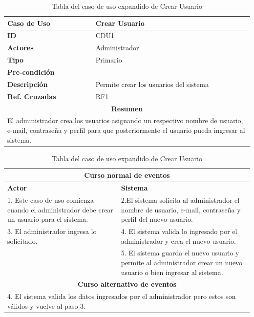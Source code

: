 \begin{table}
\centering
\begin{tabular}{|p{6cm} |p{6cm}|}
	\hline \textbf{Caso de Uso} & Crear Usuario  \\ 
	\hline \textbf{ID} & CDU1 \\ 
	\hline \textbf{Actores} & Administrador \\ 
	\hline \textbf{Tipo} & Primario \\ 
	\hline \textbf{Pre-condición} & - \\ 
	\hline \textbf{Descripción} & Permite crear los usuarios del sistema \\
	\hline \textbf{Ref. Cruzadas} & RF1 \\ 
	\hline
	\multicolumn{2}{|c|}{\textbf{Resumen}} \\
	\hline
	\multicolumn{2}{|p{12cm}|}{El administrador crea los usuarios asignando un respectivo nombre de usuario, e-mail, contraseña y perfil para que posteriormente el usuario pueda ingresar al sistema.} \\
	\hline 
\end{tabular}  

\begin{tabular}{|p{6cm}|p{6cm}|}
	
	\multicolumn{2}{|c|}{\textbf{Curso normal de eventos}} \\
	\hline \textbf{Actor} & \textbf{Sistema} \\ 
	\hline 1. Este caso de uso comienza cuando el administrador debe crear un usuario para el sistema. & 2.El sistema solicita al administrador el nombre de usuario, e-mail, contraseña y perfil del nuevo usuario.  \\ 
	3. El administrador ingresa lo solicitado. & 4. El sistema valida lo ingresado por el administrador y crea el nuevo usuario. \\
	 & 5. El sistema guarda el nuevo usuario y permite al administrador crear un nuevo usuario o bien ingresar al sistema. \\
	 \hline
	\multicolumn{2}{|c|}{\textbf{Curso alternativo de eventos}} \\
	\hline
	\multicolumn{2}{|p{12cm}|}{4. El sistema valida los datos ingresados por el administrador pero estos son válidos y vuelve al paso 3.} \\
	\hline
\end{tabular}
\caption{Tabla del caso de uso expandido de Crear Usuario}
\label{tabcdu1}
\end{table}

\newpage
\clearpage

